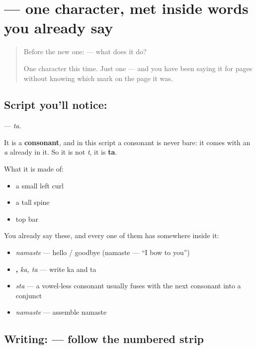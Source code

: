 \section[\texorpdfstring{\hi{त} (ta)}{त (ta)}]{ — one character, met inside words you already say}

\label{lesson:HI-S07-letter-ta}



\begin{quote}
Before the new one:  — what does it do?

One character this time. Just one — and you have been saying it for pages without knowing which mark on the page it was.
\end{quote}

\subsection*{Script you'll notice: }
\textbf{} — \emph{ta}.

It is a \textbf{consonant}, and in this script a consonant is never bare: it comes with an \emph{a} already in it. So it is not \emph{t}, it is \textbf{ta}.

What it is made of:

\begin{itemize}
\raggedright
  \item a small left curl
  \item a tall spine
  \item top bar
\end{itemize}

You already say these, and every one of them has  somewhere inside it:

\begin{itemize}
\raggedright
  \item \textbf{} \emph{namaste} — hello / goodbye (namaste — \textquotedblleft{}I bow to you\textquotedblright{})
  \item \textbf{, } \emph{ka, ta} — write ka and ta
  \item \textbf{} \emph{sta} — a vowel-less consonant usually fuses with the next consonant into a conjunct
  \item \textbf{} \emph{namaste} — assemble namaste
\end{itemize}

\subsection*{Writing:  — follow the numbered strip}

